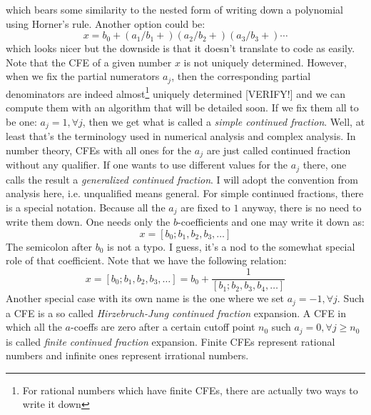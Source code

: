 which bears some similarity to the nested form of writing down a polynomial using Horner's rule. Another option could be:
\begin{equation}
x = b_0 + (a_1/b_1+) (a_2/b_2+) (a_3/b_3+) \cdots
\end{equation}
which looks nicer but the downside is that it doesn't translate to code as easily. Note that the CFE of a given number $x$ is not uniquely determined. However, when we fix the partial numerators $a_j$, then the corresponding partial denominators are indeed almost\footnote{For rational numbers which have finite CFEs, there are actually two ways to write it down} uniquely determined [VERIFY!] and we can compute them with an algorithm that will be detailed soon. If we fix them all to be one: $a_j = 1, \forall j$, then we get what is called a \emph{simple continued fraction}. Well, at least that's the terminology used in numerical analysis and complex analysis. In number theory, CFEs with all ones for the $a_j$ are just called continued fraction without any qualifier. If one wants to use different values for the $a_j$ there, one calls the result a \emph{generalized continued fraction}. I will adopt the convention from analysis here, i.e. unqualified means general. For simple continued fractions, there is a special notation. Because all the $a_j$ are fixed to $1$ anyway, there is no need to write them down. One needs only the $b$-coefficients and one may write it down as:
\begin{equation}
x = [b_0; b_1, b_2, b_3, \ldots]
\end{equation}
The semicolon after $b_0$ is not a typo. I guess, it's a nod to the somewhat special role of that coefficient. Note that we have the following relation:
\begin{equation}
x = [b_0; b_1, b_2, b_3, \ldots] = b_0 + \frac{1}{[b_1; b_2, b_3, b_4, \ldots]}
\end{equation}
Another special case with its own name is the one where we set  $a_j = -1, \forall j$. Such a CFE is a so called \emph{Hirzebruch-Jung continued fraction} expansion. A CFE in which all the $a$-coeffs are zero after a certain cutoff point $n_0$ such $a_j = 0, \forall j \geq n_0$ is called \emph{finite continued fraction} expansion. Finite CFEs represent rational numbers and infinite ones represent irrational numbers.


